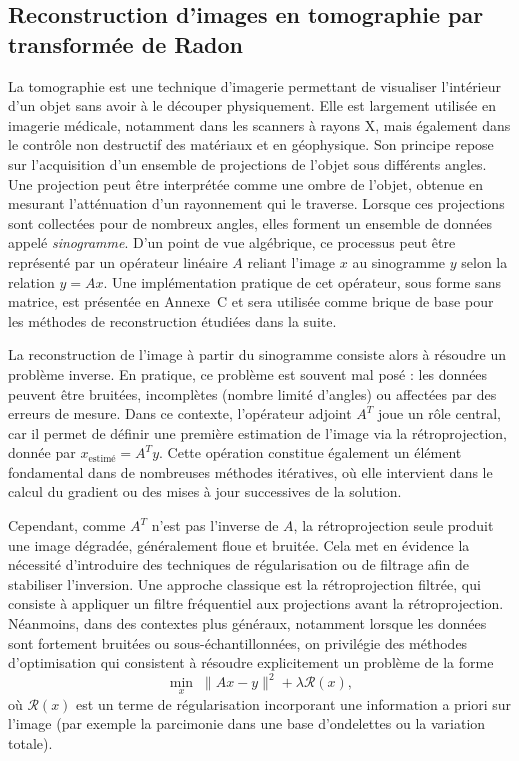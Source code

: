 \subsection{Reconstruction d'images en tomographie par transformée de Radon}
La tomographie est une technique d'imagerie permettant de visualiser l'intérieur d'un objet sans avoir à le découper physiquement. Elle est largement utilisée en imagerie médicale, notamment dans les scanners à rayons X, mais également dans le contrôle non destructif des matériaux et en géophysique. Son principe repose sur l'acquisition d'un ensemble de projections de l'objet sous différents angles. Une projection peut être interprétée comme une ombre de l'objet, obtenue en mesurant l'atténuation d'un rayonnement qui le traverse. Lorsque ces projections sont collectées pour de nombreux angles, elles forment un ensemble de données appelé \textit{sinogramme}. D'un point de vue algébrique, ce processus peut être représenté par un opérateur linéaire $A$ reliant l'image $x$ au sinogramme $y$ selon la relation $y = Ax$. Une implémentation pratique de cet opérateur, sous forme sans matrice, est présentée en Annexe~C et sera utilisée comme brique de base pour les méthodes de reconstruction étudiées dans la suite.

La reconstruction de l'image à partir du sinogramme consiste alors à résoudre un problème inverse. En pratique, ce problème est souvent mal posé : les données peuvent être bruitées, incomplètes (nombre limité d'angles) ou affectées par des erreurs de mesure. Dans ce contexte, l'opérateur adjoint $A^T$ joue un rôle central, car il permet de définir une première estimation de l'image via la rétroprojection, donnée par $x_{\text{estimé}} = A^T y$. Cette opération constitue également un élément fondamental dans de nombreuses méthodes itératives, où elle intervient dans le calcul du gradient ou des mises à jour successives de la solution.

Cependant, comme $A^T$ n'est pas l'inverse de $A$, la rétroprojection seule produit une image dégradée, généralement floue et bruitée. Cela met en évidence la nécessité d'introduire des techniques de régularisation ou de filtrage afin de stabiliser l'inversion. Une approche classique est la rétroprojection filtrée, qui consiste à appliquer un filtre fréquentiel aux projections avant la rétroprojection. Néanmoins, dans des contextes plus généraux, notamment lorsque les données sont fortement bruitées ou sous-échantillonnées, on privilégie des méthodes d'optimisation qui consistent à résoudre explicitement un problème de la forme
\[
\min_x \; \|Ax - y\|^2 + \lambda \mathcal{R}(x),
\]
où $\mathcal{R}(x)$ est un terme de régularisation incorporant une information a priori sur l'image (par exemple la parcimonie dans une base d'ondelettes ou la variation totale).

